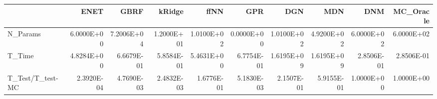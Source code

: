 \begin{tabular}{lrrrrrrrrr}
\toprule
{} &       ENET &       GBRF &     kRidge &       ffNN &        GPR &        DGN &        MDN &        DNM &  MC\_Oracle \\
\midrule
N\_Params         & 6.0000E+00 & 7.2006E+04 & 1.2000E+01 & 1.0100E+02 & 0.0000E+00 & 1.0100E+02 & 4.9200E+02 & 6.0000E+02 & 6.0000E+02 \\
T\_Time           & 4.8284E+00 & 6.6679E-01 & 5.8584E-01 & 5.4631E+00 & 6.7754E-01 & 1.6195E+09 & 1.6195E+09 & 2.8506E-01 & 2.8506E-01 \\
T\_Test/T\_test-MC & 2.3920E-04 & 4.7690E-03 & 2.4832E-03 & 1.6776E-01 & 5.1830E-03 & 2.1507E-01 & 5.9155E-01 & 1.0000E+00 & 1.0000E+00 \\
\bottomrule
\end{tabular}
